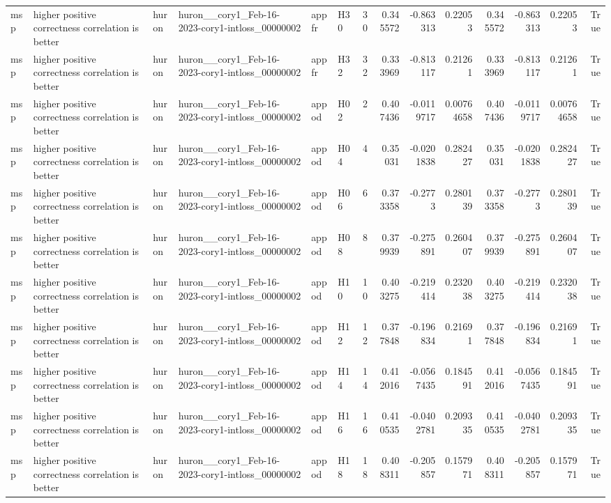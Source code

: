 \begin{longtable}{llllllrrrrrrrr}
msp & higher positive correctness correlation is better & huron & huron\_\_cory1\_Feb-16-2023-cory1-intloss\_00000002 & appfr & H30 & 30 & 0.345572 & -0.863313 & 0.22053 & 0.345572 & -0.863313 & 0.22053 & True \\
msp & higher positive correctness correlation is better & huron & huron\_\_cory1\_Feb-16-2023-cory1-intloss\_00000002 & appfr & H32 & 32 & 0.333969 & -0.813117 & 0.21261 & 0.333969 & -0.813117 & 0.21261 & True \\
msp & higher positive correctness correlation is better & huron & huron\_\_cory1\_Feb-16-2023-cory1-intloss\_00000002 & appod & H02 & 2 & 0.407436 & -0.0119717 & 0.00764658 & 0.407436 & -0.0119717 & 0.00764658 & True \\
msp & higher positive correctness correlation is better & huron & huron\_\_cory1\_Feb-16-2023-cory1-intloss\_00000002 & appod & H04 & 4 & 0.35031 & -0.0201838 & 0.282427 & 0.35031 & -0.0201838 & 0.282427 & True \\
msp & higher positive correctness correlation is better & huron & huron\_\_cory1\_Feb-16-2023-cory1-intloss\_00000002 & appod & H06 & 6 & 0.373358 & -0.2773 & 0.280139 & 0.373358 & -0.2773 & 0.280139 & True \\
msp & higher positive correctness correlation is better & huron & huron\_\_cory1\_Feb-16-2023-cory1-intloss\_00000002 & appod & H08 & 8 & 0.379939 & -0.275891 & 0.260407 & 0.379939 & -0.275891 & 0.260407 & True \\
msp & higher positive correctness correlation is better & huron & huron\_\_cory1\_Feb-16-2023-cory1-intloss\_00000002 & appod & H10 & 10 & 0.403275 & -0.219414 & 0.232038 & 0.403275 & -0.219414 & 0.232038 & True \\
msp & higher positive correctness correlation is better & huron & huron\_\_cory1\_Feb-16-2023-cory1-intloss\_00000002 & appod & H12 & 12 & 0.377848 & -0.196834 & 0.21691 & 0.377848 & -0.196834 & 0.21691 & True \\
msp & higher positive correctness correlation is better & huron & huron\_\_cory1\_Feb-16-2023-cory1-intloss\_00000002 & appod & H14 & 14 & 0.412016 & -0.0567435 & 0.184591 & 0.412016 & -0.0567435 & 0.184591 & True \\
msp & higher positive correctness correlation is better & huron & huron\_\_cory1\_Feb-16-2023-cory1-intloss\_00000002 & appod & H16 & 16 & 0.410535 & -0.0402781 & 0.209335 & 0.410535 & -0.0402781 & 0.209335 & True \\
msp & higher positive correctness correlation is better & huron & huron\_\_cory1\_Feb-16-2023-cory1-intloss\_00000002 & appod & H18 & 18 & 0.408311 & -0.205857 & 0.157971 & 0.408311 & -0.205857 & 0.157971 & True \\

\end{longtable}
